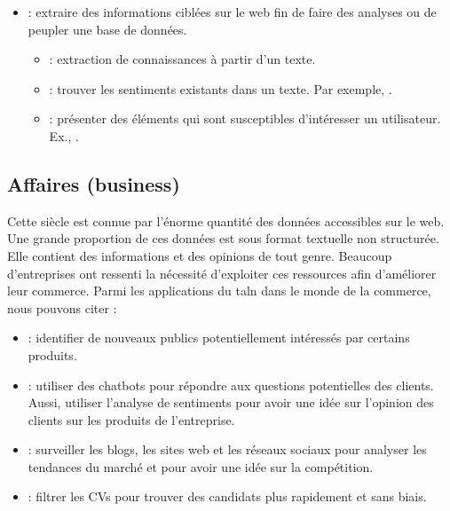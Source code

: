 \documentclass{KodeBook}
\begin{document}
\begin{itemize}
	\item {} : extraire des informations ciblées sur le web fin de faire des analyses ou de peupler une base de données.
	\begin{itemize}
		\item {} : extraction de connaissances à partir d'un texte.
		\item {} : trouver les sentiments existants dans un texte. Par exemple, .
		\item {} : présenter des éléments qui sont susceptibles d'intéresser un utilisateur. Ex., .
	\end{itemize}
\end{itemize}


\subsection{Affaires (business)}

Cette siècle est connue par l'énorme quantité des données accessibles sur le web. 
Une grande proportion de ces données est sous format textuelle non structurée.
Elle contient des informations et des opinions de tout genre. 
Beaucoup d'entreprises ont ressenti la nécessité d'exploiter ces ressources afin d'améliorer leur commerce. 
Parmi les applications du \ac{taln} dans le monde de la commerce, nous pouvons citer :
\begin{itemize}
	\item {} : identifier de nouveaux publics potentiellement intéressés par certains produits.
	\item {} : utiliser des chatbots pour répondre aux questions potentielles des clients. Aussi, utiliser l'analyse de sentiments pour avoir une idée sur l'opinion des clients sur les produits de l'entreprise.
	\item {} : surveiller les blogs, les sites web et les réseaux sociaux pour analyser les tendances du marché et pour avoir une idée sur la compétition.
	\item {} : filtrer les CVs pour trouver des candidats plus rapidement et sans biais.
\end{itemize}
\end{document}
